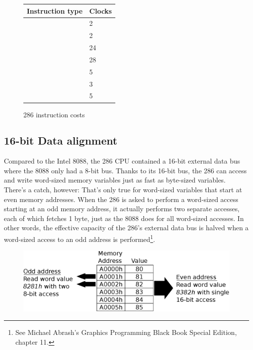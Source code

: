 \documentclass[book.tex]{subfiles}
\begin{document}
  \begin{figure}[H]
\centering  
\begin{tabularx}{\textwidth}{ X  Y }
  \toprule
  \textbf{Instruction type} &  \textbf{Clocks} \\
  \toprule 
    & 2  \\
    & 2  \\
    & 24  \\
    & 28 \\
    & 5 \\
    & 3 \\
    & 5 \\
  \toprule
\end{tabularx}
\caption{286 instruction costs\protect\footnotemark}
\end{figure}
\addtocounter{footnote}{-1}


\subsection{16-bit Data alignment}
Compared to the Intel 8088, the 286 CPU contained a 16-bit external data bus where the 8088 only had a 8-bit bus. Thanks to its 16-bit bus, the 286 can access and write word-sized memory variables just as fast as byte-sized variables. There's a catch, however: That's only true for word-sized variables that start at even memory addresses. When the 286 is asked to perform a word-sized access starting at an odd memory address, it actually performs two separate accesses, each of which fetches 1 byte, just as the 8088 does for all word-sized accesses. In other words, the effective capacity of the 286's external data bus is halved when a word-sized access to an odd address is performed\footnote{See Michael Abrash's Graphics Programming Black Book Special Edition, chapter 11.}.\\

\begin{figure}[H]
\centering
\includegraphics[width=\textwidth]{imgs/drawings/data_alignment.eps}\\
\end{figure}
\par
\end{document}

